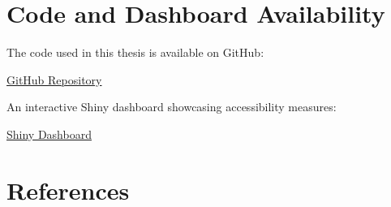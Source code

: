 \documentclass{article}
\begin{document}
\section{Code and Dashboard
Availability}\label{code-and-dashboard-availability}

The code used in this thesis is available on GitHub:

\href{https://github.com/Siva-1247/HDS_Project_2425_SN.git}{GitHub
Repository}

An interactive Shiny dashboard showcasing accessibility measures:

\href{https://siva47.shinyapps.io/dashboard/}{Shiny Dashboard}

\section*{References}\label{references}
\end{document}
